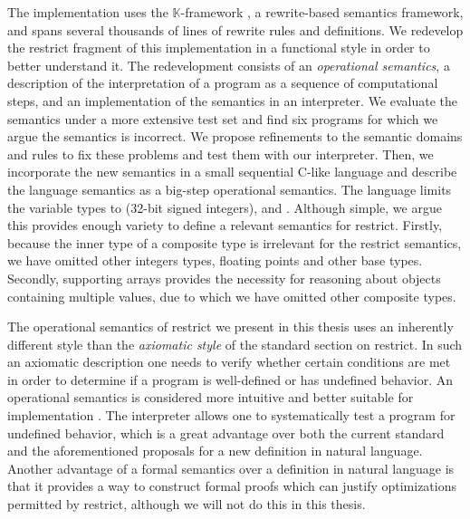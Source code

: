 The \cink{} implementation uses the $\mathbb{K}$-framework \cite{roșu2010overview}, a rewrite-based
semantics framework, and spans several thousands of lines of rewrite rules and definitions.
We redevelop the restrict fragment of this implementation in a functional style in order to better understand it.
The redevelopment consists of an \textit{operational semantics}, a description of the interpretation of a program as a sequence of computational steps,
and an implementation of the semantics in an interpreter.
We evaluate the semantics under a more extensive test set and find six programs for which we argue the semantics is incorrect.
We propose refinements to the semantic domains and rules to fix these problems and test them with our interpreter.
Then, we incorporate the new semantics in a small sequential C-like language and describe the language
semantics as a big-step operational semantics.
The language limits the variable types to  (32-bit signed integers),  and .
Although simple, we argue this provides enough variety to define a relevant semantics for restrict.
Firstly, because the inner type of a composite type is irrelevant for the restrict semantics, 
we have omitted other integers types, floating points and other base types.
Secondly, supporting arrays provides the necessity for reasoning about objects containing multiple values,
due to which we have omitted other composite types.

The operational semantics of restrict we present in this thesis uses an inherently different style
than the \textit{axiomatic style} of the standard section on restrict.
In such an axiomatic description one needs to verify whether certain conditions are met in order to determine if a program is well-defined or has undefined behavior.
An operational semantics is considered more intuitive and better suitable for implementation \cite{rocsu2012towards}.
The interpreter allows one to systematically test a program for undefined behavior, which is a great advantage over both the current standard and the aforementioned proposals for a new definition in natural language.
Another advantage of a formal semantics over a definition in natural language is that it provides a way to construct formal proofs which can justify optimizations permitted by restrict,
although we will not do this in this thesis.

